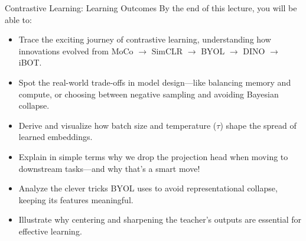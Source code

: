 \begin{frame}[allowframebreaks]{Contrastive Learning: Learning Outcomes}
    By the end of this lecture, you will be able to:
    \begin{itemize}
        \setlength{\itemsep}{-0.1em}
        \item Trace the exciting journey of contrastive learning, understanding how innovations evolved from MoCo $\rightarrow$ SimCLR $\rightarrow$ BYOL $\rightarrow$ DINO $\rightarrow$ iBOT.
        \item Spot the real-world trade-offs in model design—like balancing memory and compute, or choosing between negative sampling and avoiding Bayesian collapse.
        \item Derive and visualize how batch size and temperature ($\tau$) shape the spread of learned embeddings.
        \item Explain in simple terms why we drop the projection head when moving to downstream tasks—and why that’s a smart move!
        \item Analyze the clever tricks BYOL uses to avoid representational collapse, keeping its features meaningful.
        \item Illustrate why centering and sharpening the teacher’s outputs are essential for effective learning.
    \end{itemize}
\end{frame}
